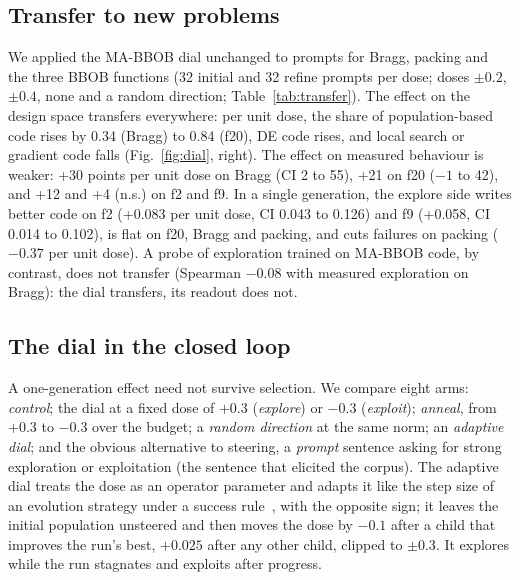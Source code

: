 \subsection{Transfer to new problems}
We applied the MA-BBOB dial unchanged to \llamea prompts for Bragg,
packing and the three BBOB functions (32 initial and 32 refine prompts
per dose; doses $\pm0.2$, $\pm0.4$, none and a random direction;
Table~\ref{tab:transfer}). The effect on the design space transfers
everywhere: per unit dose, the share of population-based code rises by
0.34 (Bragg) to 0.84 (f20), DE code rises, and local search or gradient
code falls (Fig.~\ref{fig:dial}, right). The effect on measured
behaviour is weaker: +30 points per unit dose on Bragg (CI 2 to 55), +21
on f20 ($-1$ to 42), and +12 and +4 (n.s.) on f2 and f9. In a single
generation, the explore side writes better code on f2 (+0.083 \aocc per
unit dose, CI 0.043 to 0.126) and f9 (+0.058, CI 0.014 to 0.102), is
flat on f20, Bragg and packing, and cuts failures on packing ($-0.37$
per unit dose). A probe of exploration trained on MA-BBOB code, by
contrast, does not transfer (Spearman $-0.08$ with measured exploration
on Bragg): the dial transfers, its readout does not.

\subsection{The dial in the closed loop}\label{sec:loop}
A one-generation effect need not survive selection. We compare eight
\llamea arms: \emph{control}; the dial at a fixed dose of $+0.3$
(\emph{explore}) or $-0.3$ (\emph{exploit}); \emph{anneal}, from $+0.3$
to $-0.3$ over the budget; a \emph{random direction} at the same norm;
an \emph{adaptive dial}; and the obvious alternative to steering, a
\emph{prompt} sentence asking for strong exploration or exploitation
(the sentence that elicited the corpus). The adaptive dial treats the dose as
an operator parameter and adapts it like the step size of an evolution
strategy under a success rule~\cite{rechenberg1973}, with the opposite
sign; it leaves the initial population unsteered and then moves the
dose by $-0.1$ after a child
that improves the run's best, $+0.025$ after any other child, clipped
to $\pm0.3$. It explores while the run stagnates and exploits after
progress.

